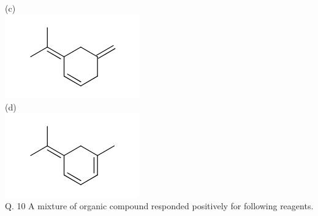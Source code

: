 \documentclass[10pt]{article}
\begin{document}
(c)\\
\includegraphics{smile-96d3ae34b1bb3e6f506114edf5cb96ec60633c51}\\
(d)\\
\includegraphics{smile-fed347b1e36e0c503dfaabeeb6b6bb0f9675f92f}\\
Q. 10 A mixture of organic compound responded positively for following reagents.
\end{document}
